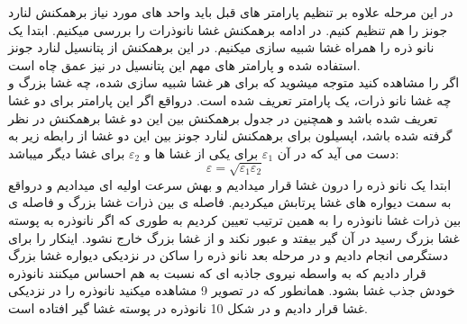 \documentclass[12pt,onecolumn,a4paper]{report}
\begin{document}
در این مرحله علاوه بر تنظیم پارامتر های قبل باید واحد های مورد نیاز برهمکنش لنارد جونز را هم تنظیم کنیم. در ادامه برهمکنش غشا نانوذرات را بررسی میکنیم. ابتدا یک نانو ذره را همراه غشا شبیه سازی میکنیم. در این برهمکنش از پتانسیل لنارد جونز استفاده شده و پارامتر های مهم این پتانسیل در  نیز عمق چاه  است. \\
اگر  را مشاهده کنید متوجه میشوید که برای هر غشا شبیه سازی شده، چه غشا بزرگ و چه غشا نانو ذرات، یک پارامتر  تعریف شده است. درواقع اگر این پارامتر برای دو غشا تعریف شده باشد و همچنین در جدول برهمکنش بین این دو غشا برهمکنش  در نظر گرفته شده باشد، اپسیلون برای برهمکنش لنارد جونز بین این دو غشا از رابطه زیر به دست می آید که در آن \begin{math} \varepsilon_1 \end{math} برای یکی از غشا ها و \begin{math} \varepsilon_2 \end{math} برای غشا دیگر میباشد:$$ \varepsilon = \sqrt{\varepsilon_{1}\varepsilon_{2}}$$
ابتدا یک نانو ذره را درون غشا قرار میدادیم و بهش سرعت اولیه ای میدادیم و درواقع به سمت دیواره های غشا پرتابش میکردیم. فاصله ی بین ذرات غشا بزرگ و فاصله ی بین ذرات غشا نانوذره را به همین ترتیب تعیین کردیم به طوری که اگر نانوذره به پوسته غشا بزرگ رسید در آن گیر بیفتد و عبور نکند و از غشا بزرگ خارج نشود. اینکار را برای دستگرمی انجام دادیم و در مرحله بعد نانو ذره را ساکن در نزدیکی دیواره غشا بزرگ قرار دادیم که به واسطه نیروی جاذبه ای که نسبت به هم احساس میکنند نانوذره خودش جذب غشا بشود. همانطور که در تصویر 9 مشاهده میکنید نانوذره را در نزدیکی غشا قرار دادیم و در شکل 10 نانوذره در پوسته غشا گیر افتاده است.\\
\end{document}
